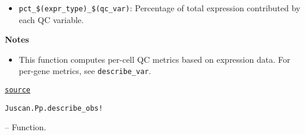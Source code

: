 \documentclass[oneside]{memoir}
\begin{document}
\begin{adjustwidth}{2em}{0pt}
\begin{itemize}
\begin{itemize}
\item \texttt{{\textquotedbl}pct\_\$(expr\_type)\_\$(qc\_var){\textquotedbl}}: Percentage of total expression contributed by each QC variable.

\end{itemize}
\end{itemize}
\textbf{Notes}

\begin{itemize}
\item This function computes per-cell QC metrics based on expression data.   For per-gene metrics, see \texttt{describe\_var}.

\end{itemize}


\href{https://github.com/zehua0417/Juscan.jl/blob/393ad1b827b678ea98a738f92af658ee9ed9a403/src/preprocessing/qc.jl#L196-L240}{\texttt{source}}


\end{adjustwidth}
\hypertarget{4701942048935169455}{\texttt{Juscan.Pp.describe\_obs!}}  -- {Function.}
\end{document}
